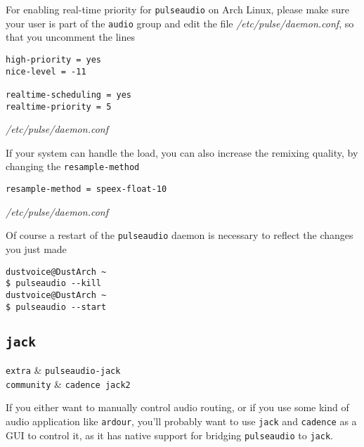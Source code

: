 \documentclass[10pt]{dustdoc}
\begin{document}
For enabling real-time priority for \texttt{pulseaudio} on Arch Linux, please make sure your user is part of the \texttt{audio} group and edit the file \textit{/etc/pulse/daemon.conf}, so that you uncomment the lines

\begin{mintedlisting}
    \begin{verbatim}
high-priority = yes
nice-level = -11

realtime-scheduling = yes
realtime-priority = 5
    \end{verbatim}

    \caption{\textit{/etc/pulse/daemon.conf}}
\end{mintedlisting}

If your system can handle the load, you can also increase the remixing quality, by changing the \texttt{resample-method}

\begin{mintedlisting}
    \begin{verbatim}
resample-method = speex-float-10
    \end{verbatim}

    \caption{\textit{/etc/pulse/daemon.conf}}
\end{mintedlisting}

Of course a restart of the \texttt{pulseaudio} daemon is necessary to reflect the changes you just made

\begin{verbatim}
dustvoice@DustArch ~
$ pulseaudio --kill
dustvoice@DustArch ~
$ pulseaudio --start
\end{verbatim}

\subsection{\texttt{jack}}
\label{sec:jack}

\begin{packagetable}
    \texttt{extra} & \texttt{pulseaudio-jack} \\
    \texttt{community} & \texttt{cadence jack2} \\
\end{packagetable}

If you either want to manually control audio routing, or if you use some kind of audio application like \texttt{ardour}, you’ll probably want to use \texttt{jack} and \texttt{cadence} as a GUI to control it, as it has native support for bridging \texttt{pulseaudio} to \texttt{jack}.
\end{document}
